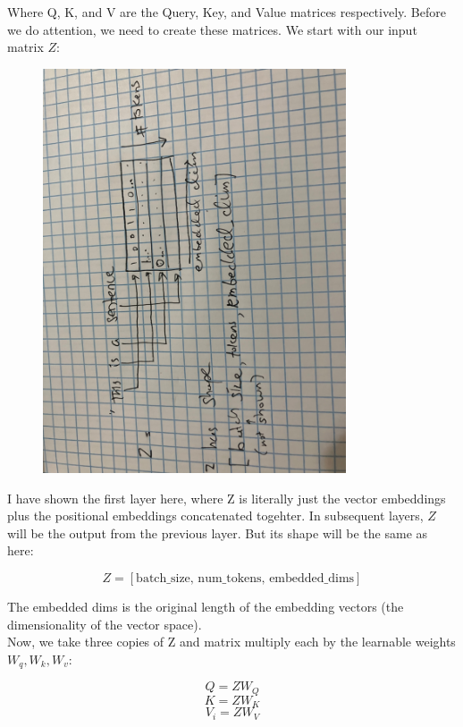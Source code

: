 \documentclass[12pt]{article}
\begin{document}
\begin{enumerate}
Where Q, K, and V are the Query, Key, and Value matrices respectively. Before we do attention, we need to create these matrices. We start with our input matrix \(Z\):
\begin{figure}[H]
    \centering
    \includegraphics[width=0.8\textwidth, angle=180]{./linear_transformation.jpg}
\end{figure}
I have shown the first layer here, where Z is literally just the vector embeddings plus the positional embeddings concatenated togehter. In subsequent layers, \(Z\) will be the output from the previous layer. But its shape will be the same as here:

\[Z = [\text{batch\_size, num\_tokens, embedded\_dims}]\]

The embedded dims is the original length of the embedding vectors (the dimensionality of the vector space).\\

Now, we take three copies of Z and matrix multiply each by the learnable weights \(W_q, W_k, W_v\):


\[Q= ZW_Q\]
\[K = ZW_K\]
\[V_i = ZW_V\]


\end{enumerate}
\end{document}
